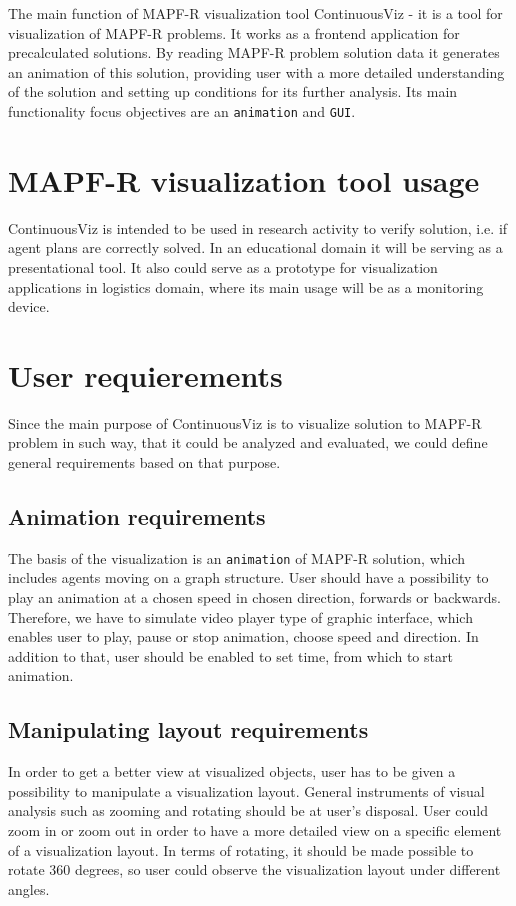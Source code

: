 \documentclass[thesis=B,english]{FITthesis}[2019/12/23]
\begin{document}
The main function of MAPF-R visualization tool ContinuousViz - it is a tool for visualization of MAPF-R problems. It works as a frontend application for precalculated solutions. By reading MAPF-R problem solution data it generates an animation of this solution, providing user with a more detailed understanding of the solution and setting up conditions for its further analysis. Its main functionality focus objectives are an \verb|animation| and \verb|GUI|.

\section{MAPF-R visualization tool usage}

ContinuousViz is intended to be used in research activity to verify solution, i.e. if agent plans are correctly solved. In an educational domain it will be serving as a presentational tool. It also could serve as a prototype for  visualization applications in logistics domain, where its main usage will be as a monitoring device.

\section{User requierements}

Since the main purpose of ContinuousViz is to visualize solution to MAPF-R problem in such way, that it could be analyzed and evaluated, we could define general requirements based on that purpose. 

\subsection{Animation requirements}

The basis of the visualization is an \verb|animation| of MAPF-R solution, which includes agents moving on a graph structure. User should have a possibility to play an animation at a chosen speed in chosen direction, forwards or backwards. Therefore, we have to simulate video player type of graphic interface, which enables user to play, pause or stop animation, choose speed and direction. In addition to that, user should be enabled to set time, from which to start animation.

\subsection{Manipulating layout requirements}

In order to get a better view at visualized objects, user has to be given a possibility to manipulate a visualization layout. General instruments of visual analysis such as zooming and rotating should be at user's disposal. User could zoom in or zoom out in order to have a more detailed view on a specific element of a visualization layout. In terms of rotating, it should be made possible to rotate 360 degrees, so user could observe the visualization layout under different angles.
\end{document}
